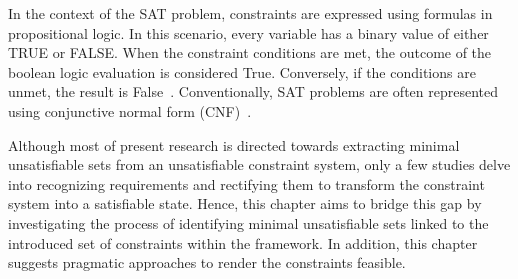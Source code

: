     In the context of the SAT problem, constraints are expressed using formulas in propositional logic. In this scenario, every variable has a binary value of either TRUE or FALSE. When the constraint conditions are met, the outcome of the boolean logic evaluation is considered True. Conversely, if the conditions are unmet, the result is False~\cite{biere2009handbook}. Conventionally, SAT problems are often represented using conjunctive normal form (CNF)~\cite{sulflow2008using}.
    
    
    
    
    Although most of present research is directed towards extracting minimal unsatisfiable sets from an unsatisfiable constraint system, only a few studies delve into recognizing requirements and rectifying them to transform the constraint system into a satisfiable state.
    Hence, this chapter aims to bridge this gap by investigating the process of identifying minimal unsatisfiable sets linked to the introduced set of constraints within the framework. In addition, this chapter suggests pragmatic approaches to render the constraints feasible.
    
   
